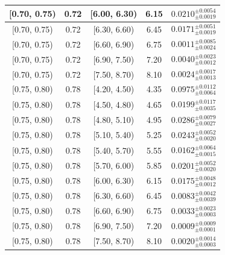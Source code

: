 \begin{longtable}{|c|c|c|c|c|}
\hline
[0.70, 0.75) & 0.72 & [6.00, 6.30) & 6.15 & $0.0210^{ \pm 0.0054 }_{ \pm 0.0019 }$ \\ 
\hline
[0.70, 0.75) & 0.72 & [6.30, 6.60) & 6.45 & $0.0171^{ \pm 0.0051 }_{ \pm 0.0019 }$ \\ 
\hline
[0.70, 0.75) & 0.72 & [6.60, 6.90) & 6.75 & $0.0011^{ \pm 0.0085 }_{ \pm 0.0024 }$ \\ 
\hline
[0.70, 0.75) & 0.72 & [6.90, 7.50) & 7.20 & $0.0040^{ \pm 0.0023 }_{ \pm 0.0012 }$ \\ 
\hline
[0.70, 0.75) & 0.72 & [7.50, 8.70) & 8.10 & $0.0024^{ \pm 0.0017 }_{ \pm 0.0013 }$ \\ 
\hline
[0.75, 0.80) & 0.78 & [4.20, 4.50) & 4.35 & $0.0975^{ \pm 0.0112 }_{ \pm 0.0064 }$ \\ 
\hline
[0.75, 0.80) & 0.78 & [4.50, 4.80) & 4.65 & $0.0199^{ \pm 0.0117 }_{ \pm 0.0035 }$ \\ 
\hline
[0.75, 0.80) & 0.78 & [4.80, 5.10) & 4.95 & $0.0286^{ \pm 0.0079 }_{ \pm 0.0027 }$ \\ 
\hline
[0.75, 0.80) & 0.78 & [5.10, 5.40) & 5.25 & $0.0243^{ \pm 0.0052 }_{ \pm 0.0020 }$ \\ 
\hline
[0.75, 0.80) & 0.78 & [5.40, 5.70) & 5.55 & $0.0162^{ \pm 0.0064 }_{ \pm 0.0015 }$ \\ 
\hline
[0.75, 0.80) & 0.78 & [5.70, 6.00) & 5.85 & $0.0201^{ \pm 0.0052 }_{ \pm 0.0020 }$ \\ 
\hline
[0.75, 0.80) & 0.78 & [6.00, 6.30) & 6.15 & $0.0175^{ \pm 0.0048 }_{ \pm 0.0012 }$ \\ 
\hline
[0.75, 0.80) & 0.78 & [6.30, 6.60) & 6.45 & $0.0083^{ \pm 0.0042 }_{ \pm 0.0039 }$ \\ 
\hline
[0.75, 0.80) & 0.78 & [6.60, 6.90) & 6.75 & $0.0033^{ \pm 0.0023 }_{ \pm 0.0003 }$ \\ 
\hline
[0.75, 0.80) & 0.78 & [6.90, 7.50) & 7.20 & $0.0009^{ \pm 0.0009 }_{ \pm 0.0001 }$ \\ 
\hline
[0.75, 0.80) & 0.78 & [7.50, 8.70) & 8.10 & $0.0020^{ \pm 0.0014 }_{ \pm 0.0003 }$ \\ 
\hline
\end{longtable}
\endgroup
